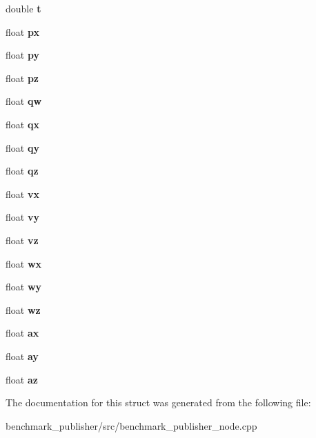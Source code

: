 \begin{DoxyCompactItemize}
\item 
\mbox{\label{structData_af30e87c8f576878effbb050b6908352d}} 
double {\bfseries t}
\item 
\mbox{\label{structData_abdcc703465065928081830d1adb8933e}} 
float {\bfseries px}
\item 
\mbox{\label{structData_a2e71f3a5743235464467b6ee77c11e3d}} 
float {\bfseries py}
\item 
\mbox{\label{structData_a7f1461aaa1564d119ecbaebee0bbb039}} 
float {\bfseries pz}
\item 
\mbox{\label{structData_a216cf86fa1128b46c577af3b1d5bec7c}} 
float {\bfseries qw}
\item 
\mbox{\label{structData_a4e85d2c733cb563db0d33a049b5839a2}} 
float {\bfseries qx}
\item 
\mbox{\label{structData_afbc9d6f248917946d36cdcc66afbfca9}} 
float {\bfseries qy}
\item 
\mbox{\label{structData_ad8fad9789bc5dbb5370100318b49ab05}} 
float {\bfseries qz}
\item 
\mbox{\label{structData_a382ef56cf80be090172065082bda493f}} 
float {\bfseries vx}
\item 
\mbox{\label{structData_a0ee23c5cd0d5ed16ba3a6ac75e776eb0}} 
float {\bfseries vy}
\item 
\mbox{\label{structData_af2969d9014a82586023dccd12c6f869a}} 
float {\bfseries vz}
\item 
\mbox{\label{structData_a5079f3ccb391d6578615839629dfb58e}} 
float {\bfseries wx}
\item 
\mbox{\label{structData_a3c8cbb0ef35204ef048714665127664f}} 
float {\bfseries wy}
\item 
\mbox{\label{structData_ab06a01c5e0db3f770d38dddbc2b6172b}} 
float {\bfseries wz}
\item 
\mbox{\label{structData_aedcab7fcf8b055783b9ac3f8d5e00a5e}} 
float {\bfseries ax}
\item 
\mbox{\label{structData_af24ed7b872419bd5bca14a7dfcd50561}} 
float {\bfseries ay}
\item 
\mbox{\label{structData_a88eb7b0726318996110f187a4c94d287}} 
float {\bfseries az}
\end{DoxyCompactItemize}


The documentation for this struct was generated from the following file\+:\begin{DoxyCompactItemize}
\item 
benchmark\+\_\+publisher/src/benchmark\+\_\+publisher\+\_\+node.\+cpp\end{DoxyCompactItemize}
